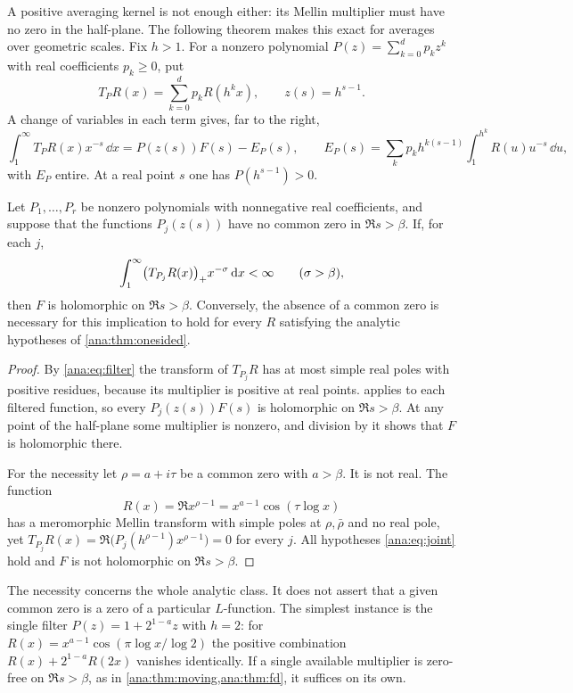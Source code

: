 A positive averaging kernel is not enough either: its Mellin multiplier must have no zero in
the half-plane. The following theorem makes this exact for averages over geometric scales.
Fix $h>1$. For a nonzero polynomial $P(z)=\sum_{k=0}^dp_kz^k$ with real coefficients $p_k\ge0$,
put
\[
 T_PR(x)=\sum_{k=0}^dp_kR(h^kx),\qquad z(s)=h^{s-1}.
\]
A change of variables in each term gives, far to the right,
\begin{equation}\label{ana:eq:filter}
 \int_1^\infty T_PR(x)x^{-s}\,\dd x=P(z(s))F(s)-E_P(s),\qquad
 E_P(s)=\sum_kp_kh^{k(s-1)}\int_1^{h^k}R(u)u^{-s}\,\dd u,
\end{equation}
with $E_P$ entire. At a real point $s$ one has $P(h^{s-1})>0$.

\begin{theorem}\label{ana:thm:joint}
Let $P_1,\dots,P_r$ be nonzero polynomials with nonnegative real coefficients, and suppose that
the functions $P_j(z(s))$ have no common zero in $\Re s>\beta$. If, for each $j$,
\begin{equation}\label{ana:eq:joint}
 \int_1^\infty\bigl(T_{P_j}R(x)\bigr)_{+}x^{-\sigma}\,\mathrm{d} x<\infty\qquad(\sigma>\beta),
\end{equation}
then $F$ is holomorphic on $\Re s>\beta$. Conversely, the absence of a common zero is necessary
for this implication to hold for every $R$ satisfying the analytic hypotheses of
\cref{ana:thm:onesided}.
\end{theorem}

\begin{proof}
By \eqref{ana:eq:filter} the transform of $T_{P_j}R$ has at most simple real poles with positive
residues, because its multiplier is positive at real points.  applies to
each filtered function, so every $P_j(z(s))F(s)$ is holomorphic on $\Re s>\beta$. At any point
of the half-plane some multiplier is nonzero, and division by it shows that $F$ is holomorphic
there.

For the necessity let $\rho=a+i\tau$ be a common zero with $a>\beta$. It is not real. The
function
\[
 R(x)=\Re x^{\rho-1}=x^{a-1}\cos(\tau\log x)
\]
has a meromorphic Mellin transform with simple poles at $\rho,\bar\rho$ and no real pole, yet
$T_{P_j}R(x)=\Re\bigl(P_j(h^{\rho-1})x^{\rho-1}\bigr)=0$ for every $j$. All hypotheses
\eqref{ana:eq:joint} hold and $F$ is not holomorphic on $\Re s>\beta$.
\end{proof}

The necessity concerns the whole analytic class. It does not assert that a given common zero is
a zero of a particular $L$-function. The simplest instance is the single filter
$P(z)=1+2^{1-a}z$ with $h=2$: for $R(x)=x^{a-1}\cos(\pi\log x/\log2)$ the positive combination
$R(x)+2^{1-a}R(2x)$ vanishes identically. If a single available multiplier is zero-free on
$\Re s>\beta$, as in \cref{ana:thm:moving,ana:thm:fd}, it suffices on its own.

